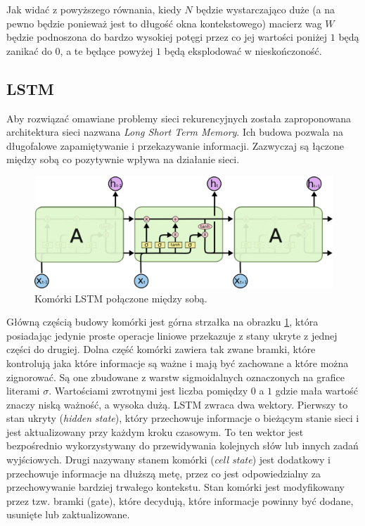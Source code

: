 \documentclass[data-science]{agh-wi} %
\begin{document}
Jak widać z powyższego równania, kiedy $N$ będzie wystarczająco duże (a na pewno będzie ponieważ jest to długość okna kontekstowego) macierz wag $W$ będzie podnoszona do bardzo wysokiej potęgi przez co jej wartości poniżej $1$ będą zanikać do $0$, a te będące powyżej $1$ będą eksplodować w nieskończoność.

\subsection{LSTM}
Aby rozwiązać omawiane problemy sieci rekurencyjnych została zaproponowana architektura sieci nazwana \textit{Long Short Term Memory}. Ich budowa pozwala na długofalowe zapamiętywanie i przekazywanie informacji. Zazwyczaj są łączone między sobą co pozytywnie wpływa na działanie sieci.

\begin{figure}[ht!]
    \begin{center}
        \includegraphics[width=0.6\linewidth]{./img/LSTM3-chain.png}
    \end{center}
    \caption{Komórki LSTM połączone między sobą.}\label{fig:lstm_chain}
\end{figure}

Główną częścią budowy komórki jest górna strzałka na obrazku \ref*{fig:lstm_chain}, która posiadając jedynie proste operacje liniowe przekazuje z stany ukryte z jednej części do drugiej. Dolna część komórki zawiera tak zwane bramki, które kontrolują jaka które informacje są ważne i mają być zachowane a które można zignorować. Są one zbudowane z warstw sigmoidalnych oznaczonych na grafice literami $\sigma$. Wartościami zwrotnymi jest liczba pomiędzy $0$ a $1$ gdzie mała wartość znaczy niską ważność, a wysoka dużą. LSTM zwraca dwa wektory. Pierwszy to stan ukryty (\textit{hidden state}), który przechowuje informacje o bieżącym stanie sieci i jest aktualizowany przy każdym kroku czasowym. To ten wektor jest bezpośrednio wykorzystywany do przewidywania kolejnych słów lub innych zadań wyjściowych. Drugi nazywany stanem komórki (\textit{cell state}) jest dodatkowy i przechowuje informacje na dłuższą metę, przez co jest odpowiedzialny za przechowywanie bardziej trwałego kontekstu. Stan komórki jest modyfikowany przez tzw. bramki (gate), które decydują, które informacje powinny być dodane, usunięte lub zaktualizowane.
\end{document}
